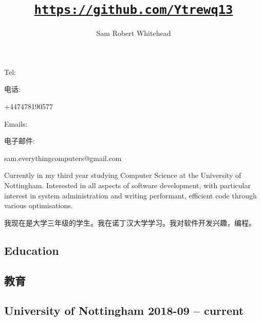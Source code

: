     \title{\href{https://github.com/Ytrewq13}{\texttt{https://github.com/Ytrewq13}}}
    \author{Sam Robert Whitehead}

    \maketitle

    \pagestyle{empty}

\begin{xen}
    Tel:
\end{xen}
\begin{xcn}
    电话:
\end{xcn}
    +447478190577
    \hfill
\begin{xen}
    Emails:
\end{xen}
\begin{xcn}
    电子邮件:
\end{xcn}
    sam.everythingcomputers@gmail.com\\
    {}
    \vspace{1mm}
\begin{xen}
    Currently in my third year studying Computer Science at the University of
    Nottingham. Interested in all aspects of software development, with
    particular interest in system administration and writing performant,
    efficient code through various optimisations.
\end{xen}
\begin{xcn}
    我现在是大学三年级的学生。我在诺丁汉大学学习。我对软件开发兴趣，编程。
\end{xcn}
\begin{xen}
    \section{Education}
\end{xen}
\begin{xcn}
    \section{教育}
\end{xcn}
\begin{xen}
    \subsection{University of Nottingham
        \hfill 2018-09 -- current}
\end{xen}

